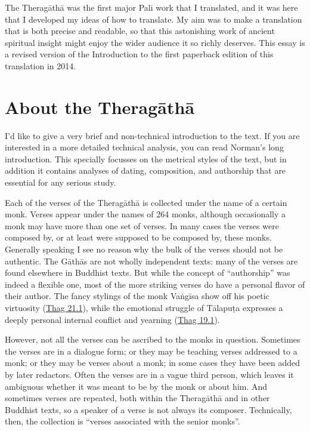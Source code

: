 \documentclass[12pt,openany]{book}%
\begin{document}
The \textsanskrit{Theragāthā} was the first major Pali work that I translated, and it was here that I developed my ideas of how to translate. My aim was to make a translation that is both precise and readable, so that this astonishing work of ancient spiritual insight might enjoy the wider audience it so richly deserves. This essay is a revised version of the Introduction to the first paperback edition of this translation in 2014.

\section*{About the \textsanskrit{Theragāthā}}

I’d like to give a very brief and non-technical introduction to the text. If you are interested in a more detailed technical analysis, you can read Norman’s long introduction. This specially focusses on the metrical styles of the text, but in addition it contains analyses of dating, composition, and authorship that are essential for any serious study.

Each of the verses of the \textsanskrit{Theragāthā} is collected under the name of a certain monk. Verses appear under the names of 264 monks, although occasionally a monk may have more than one set of verses. In many cases the verses were composed by, or at least were supposed to be composed by, these monks. Generally speaking I see no reason why the bulk of the verses should not be authentic. The \textsanskrit{Gāthās} are not wholly independent texts: many of the verses are found elsewhere in Buddhist texts. But while the concept of “authorship” was indeed a flexible one, most of the more striking verses do have a personal flavor of their author. The fancy stylings of the monk \textsanskrit{Vaṅgīsa} show off his poetic virtuosity (\href{https://suttacentral.net/thag21.1}{Thag 21.1}), while the emotional struggle of \textsanskrit{Tālapuṭa} expresses a deeply personal internal conflict and yearning (\href{https://suttacentral.net/thag19.1}{Thag 19.1}).

However, not all the verses can be ascribed to the monks in question. Sometimes the verses are in a dialogue form; or they may be teaching verses addressed to a monk; or they may be verses about a monk; in some cases they have been added by later redactors. Often the verses are in a vague third person, which leaves it ambiguous whether it was meant to be by the monk or about him. And sometimes verses are repeated, both within the \textsanskrit{Theragāthā} and in other Buddhist texts, so a speaker of a verse is not always its composer. Technically, then, the collection is “verses associated with the senior monks”.
\end{document}
